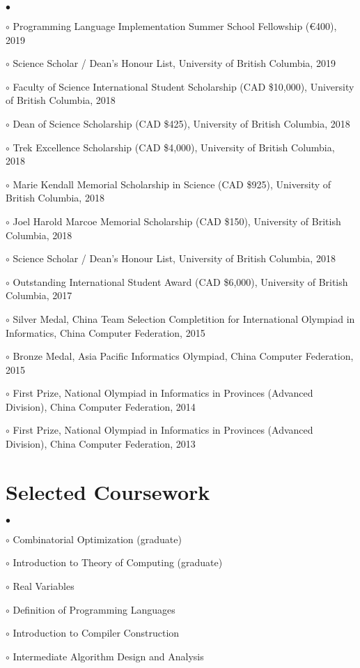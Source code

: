\documentclass[margin,line]{res}
\newenvironment{list2}{
  \begin{list}{$\bullet$}{%
      \setlength{\itemsep}{0in}
      \setlength{\parsep}{0in} \setlength{\parskip}{0in}
      \setlength{\topsep}{0in} \setlength{\partopsep}{0in}
      \setlength{\leftmargin}{0.2in}}}{\end{list}}
\begin{document}
\begin{resume}
\begin{list2}
\item[$\circ$] Programming Language Implementation Summer School Fellowship (€400), 2019
\item[$\circ$] Science Scholar / Dean's Honour List, University of British Columbia, 2019
\item[$\circ$] Faculty of Science International Student Scholarship (CAD \$10,000), University of British Columbia, 2018
\item[$\circ$] Dean of Science Scholarship (CAD \$425), University of British Columbia, 2018
\item[$\circ$] Trek Excellence Scholarship (CAD \$4,000), University of British Columbia, 2018
\item[$\circ$] Marie Kendall Memorial Scholarship in Science (CAD \$925), University of British Columbia, 2018
\item[$\circ$] Joel Harold Marcoe Memorial Scholarship (CAD \$150), University of British Columbia, 2018
\item[$\circ$] Science Scholar / Dean's Honour List, University of British Columbia, 2018 
\item[$\circ$] Outstanding International Student Award (CAD \$6,000), University of British Columbia, 2017
\item[$\circ$] Silver Medal, China Team Selection Completition for International Olympiad in Informatics, China Computer Federation, 2015
\item[$\circ$] Bronze Medal, Asia Pacific Informatics Olympiad, China Computer Federation, 2015
\item[$\circ$] First Prize, National Olympiad in Informatics in Provinces (Advanced Division), China Computer Federation, 2014
\item[$\circ$] First Prize, National Olympiad in Informatics in Provinces (Advanced Division), China Computer Federation, 2013
\end{list2}


\section{\sc Selected Coursework}

\begin{list2}
\item[$\circ$] Combinatorial Optimization (graduate)
\item[$\circ$] Introduction to Theory of Computing (graduate)
\item[$\circ$] Real Variables
\item[$\circ$] Definition of Programming Languages
\item[$\circ$] Introduction to Compiler Construction
\item[$\circ$] Intermediate Algorithm Design and Analysis 
\end{list2}



\end{resume}
\end{document}
